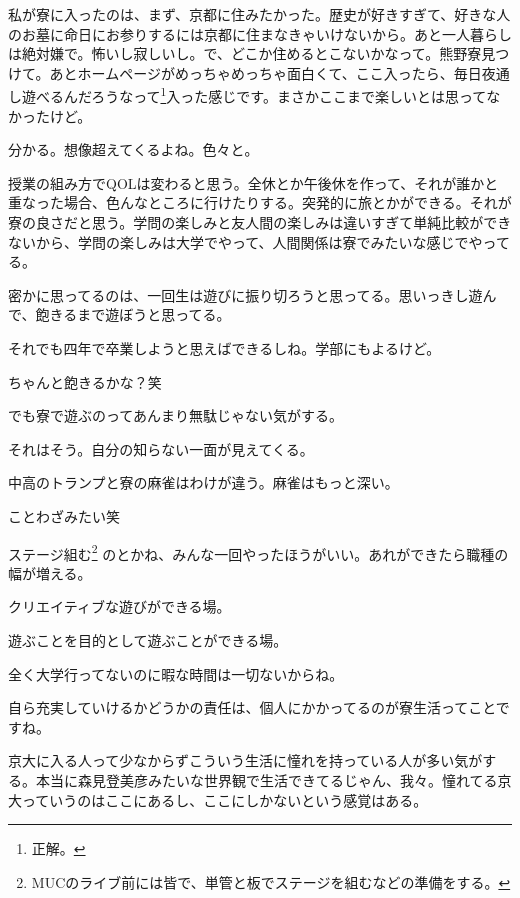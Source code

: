 \begin{multicols}{2}
私が寮に入ったのは、まず、京都に住みたかった。歴史が好きすぎて、好きな人のお墓に命日にお参りするには京都に住まなきゃいけないから。あと一人暮らしは絶対嫌で。怖いし寂しいし。で、どこか住めるとこないかなって。熊野寮見つけて。あとホームページがめっちゃめっちゃ面白くて、ここ入ったら、毎日夜通し遊べるんだろうなって\footnote{正解。}入った感じです。まさかここまで楽しいとは思ってなかったけど。

分かる。想像超えてくるよね。色々と。

授業の組み方でQOLは変わると思う。全休とか午後休を作って、それが誰かと重なった場合、色んなところに行けたりする。突発的に旅とかができる。それが寮の良さだと思う。学問の楽しみと友人間の楽しみは違いすぎて単純比較ができないから、学問の楽しみは大学でやって、人間関係は寮でみたいな感じでやってる。

密かに思ってるのは、一回生は遊びに振り切ろうと思ってる。思いっきし遊んで、飽きるまで遊ぼうと思ってる。

それでも四年で卒業しようと思えばできるしね。学部にもよるけど。

ちゃんと飽きるかな？笑

でも寮で遊ぶのってあんまり無駄じゃない気がする。

それはそう。自分の知らない一面が見えてくる。

中高のトランプと寮の麻雀はわけが違う。麻雀はもっと深い。

ことわざみたい笑

ステージ組む\footnote{ MUCのライブ前には皆で、単管と板でステージを組むなどの準備をする。} のとかね、みんな一回やったほうがいい。あれができたら職種の幅が増える。

クリエイティブな遊びができる場。

遊ぶことを目的として遊ぶことができる場。

全く大学行ってないのに暇な時間は一切ないからね。

自ら充実していけるかどうかの責任は、個人にかかってるのが寮生活ってことですね。

京大に入る人って少なからずこういう生活に憧れを持っている人が多い気がする。本当に森見登美彦みたいな世界観で生活できてるじゃん、我々。憧れてる京大っていうのはここにあるし、ここにしかないという感覚はある。



\end{multicols}
